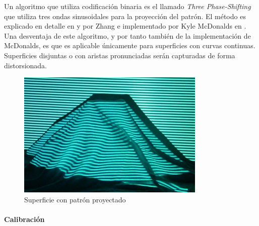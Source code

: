 Un algoritmo que utiliza codificación binaria es el llamado \emph{Three Phase-Shifting} que utiliza tres ondas sinusoidales para la proyección del patrón. El método es explicado en detalle en \cite{3DShapeMeasurement} y \cite{SLThreeStepPhaseShift} por Zhang e implementado por Kyle McDonalds en \cite{KyleMcDonald}. Una desventaja de este algoritmo, y por tanto también de la implementación de McDonalds, es que es aplicable únicamente para superficies con curvas continuas. Superficies disjuntas o con aristas pronunciadas serán capturadas de forma distorsionada.

\begin{figure}[H]
  \centering
    \includegraphics[width=0.8\textwidth]{./Cap2_videomapping/phase2.jpg}
  \caption{Superficie con patrón proyectado}
  \label{fig:phase2}
\end{figure}

\paragraph{Calibración}

